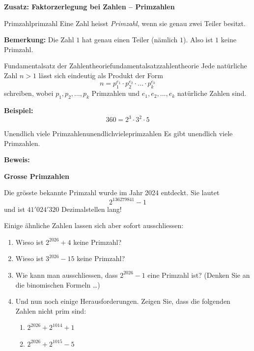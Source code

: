 \clearpage
\textbf{Zusatz: Faktorzerlegung bei Zahlen -- Primzahlen}

\begin{definition}{Primzahl}{primzahl}
    Eine Zahl heisst \textit{Primzahl}, wenn sie genau zwei Teiler besitzt.
\end{definition}

\textbf{Bemerkung:} Die Zahl \(1\) hat genau einen Teiler (nämlich \(1\)). Also ist \(1\) keine Primzahl.

\begin{satz}{Fundamentalsatz der Zahlentheorie}{fundamentalsatzzahlentheorie}
    Jede natürliche Zahl \(n>1\) lässt sich eindeutig als Produkt der Form
    \[
        n=p_1^{e_1}\cdot p_2^{e_2}\cdot\ldots\cdot p_k^{e_k}
    \]
    schreiben, wobei \(p_1,p_2,\ldots,p_k\) Primzahlen und
    \(e_1,e_2,\ldots,e_k\) natürliche Zahlen sind.
\end{satz}

\textbf{Beispiel:}
\[
    360=2^3\cdot3^2\cdot5
\]

\begin{satz}{Unendlich viele Primzahlen}{unendlichvieleprimzahlen}
    Es gibt unendlich viele Primzahlen.
\end{satz}

\textbf{Beweis:}

\clearpage

\textbf{Grosse Primzahlen}

Die grösste bekannte Primzahl wurde im Jahr 2024 entdeckt. Sie lautet
\[
    2^{136279841}-1
\]
und ist \(41'024'320\) Dezimalstellen lang!

Einige ähnliche Zahlen lassen sich aber sofort ausschliessen:

\begin{enumerate}
    \item Wieso ist \(2^{2026}+4\) keine Primzahl?
    \item Wieso ist \(3^{2026}-15\) keine Primzahl?
    \item Wie kann man ausschliessen, dass \(2^{2026}-1\) eine Primzahl ist?
          (Denken Sie an die binomischen Formeln \ldots)
    \item Und nun noch einige Herausforderungen. Zeigen Sie, dass die folgenden Zahlen nicht prim sind:
          \begin{enumerate}
              \item \(2^{2026}+2^{1014}+1\)
              \item \(2^{2026}+2^{1015}-5\)
          \end{enumerate}
\end{enumerate}

